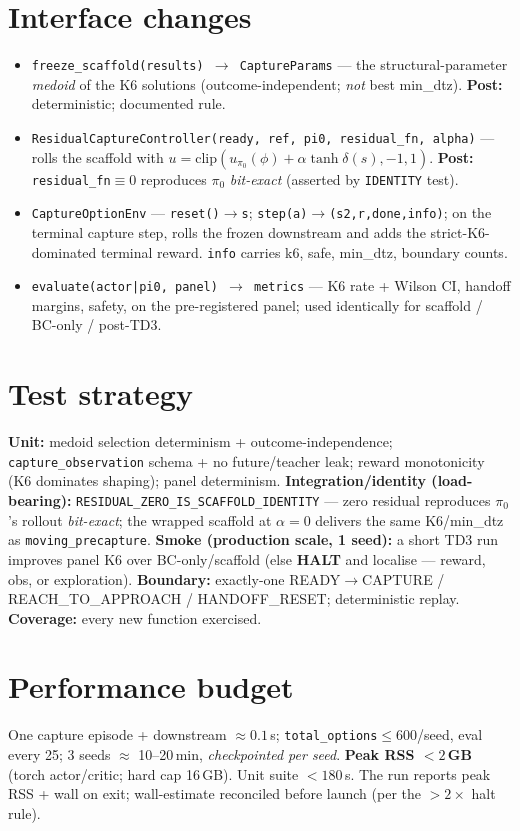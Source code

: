 \documentclass[11pt]{article}
\newcommand{\code}[1]{\texttt{\small #1}}
\newcommand{\halt}{\textcolor{red!70!black}{\textbf{HALT}}}
\begin{document}
\section{Interface changes}
\begin{itemize}[nosep,leftmargin=1.4em]
  \item \code{freeze\_scaffold(results) $\to$ CaptureParams} --- the structural-parameter \emph{medoid} of the K6
  solutions (outcome-independent; \emph{not} best min\_dtz). \textbf{Post:} deterministic; documented rule.
  \item \code{ResidualCaptureController(ready, ref, pi0, residual\_fn, alpha)} --- rolls the scaffold with
  $u=\mathrm{clip}(u_{\pi_0}(\phi)+\alpha\tanh\delta(s),-1,1)$. \textbf{Post:} \code{residual\_fn}$\equiv0$ reproduces
  $\pi_0$ \emph{bit-exact} (asserted by \code{IDENTITY} test).
  \item \code{CaptureOptionEnv} --- \code{reset()$\to$s}; \code{step(a)$\to$(s2,r,done,info)}; on the terminal capture
  step, rolls the frozen downstream and adds the strict-K6-dominated terminal reward. \code{info} carries k6, safe,
  min\_dtz, boundary counts.
  \item \code{evaluate(actor|pi0, panel) $\to$ metrics} --- K6 rate + Wilson CI, handoff margins, safety, on the
  pre-registered panel; used identically for scaffold / BC-only / post-TD3.
\end{itemize}

\section{Test strategy}
\textbf{Unit:} medoid selection determinism + outcome-independence; \code{capture\_observation} schema + no future/teacher
leak; reward monotonicity (K6 dominates shaping); panel determinism. \textbf{Integration/identity (load-bearing):}
\code{RESIDUAL\_ZERO\_IS\_SCAFFOLD\_IDENTITY} --- zero residual reproduces $\pi_0$'s rollout \emph{bit-exact}; the wrapped
scaffold at $\alpha{=}0$ delivers the same K6/min\_dtz as \code{moving\_precapture}. \textbf{Smoke (production scale, 1
seed):} a short TD3 run improves panel K6 over BC-only/scaffold (else \halt{} and localise --- reward, obs, or exploration).
\textbf{Boundary:} exactly-one READY$\to$CAPTURE / REACH\_TO\_APPROACH / HANDOFF\_RESET; deterministic replay.
\textbf{Coverage:} every new function exercised.

\section{Performance budget}
One capture episode + downstream $\approx 0.1$\,s; \code{total\_options}$\le600$/seed, eval every 25; 3 seeds
$\approx$ 10--20\,min, \emph{checkpointed per seed}. \textbf{Peak RSS $<2$\,GB} (torch actor/critic; hard cap 16\,GB).
Unit suite $<180$\,s. The run reports peak RSS + wall on exit; wall-estimate reconciled before launch (per the $>2\times$
halt rule).
\end{document}
